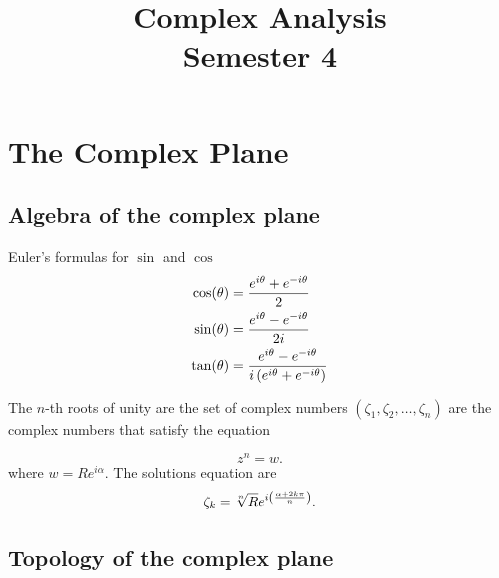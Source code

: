 \documentclass{report}
\title{\Huge{Complex Analysis}\\Semester 4}
\author{}
\date{}
\begin{document}
\maketitle
\newpage%
\tableofcontents
\pagebreak

\chapter{The Complex Plane}
\section{Algebra of the complex plane}

\begin{figure}[h]
	\centering
\end{figure}

Euler’s formulas for $\sin$ and $\cos$
\begin{align*}
	\cos(\theta) & = \frac{e^{i\theta} + e^{-i\theta}}{2}                                 \\
	\sin(\theta) & = \frac{e^{i\theta} - e^{-i\theta}}{2i}                                \\
	\tan(\theta) & = \frac{e^{i\theta} - e^{-i\theta}}{i\left(e^{i\theta}+e^{-i\theta}\right)}
\end{align*}

The $n$-th roots of unity are the set of complex numbers $(\zeta_1,\zeta_2,\dots,\zeta_n)$ are the complex numbers that satisfy the equation

\[
	z^n = w
	.\]
where $w=Re^{i\alpha}$. The solutions equation are
\[
	\zeta_k = \sqrt[n]{R} e^{i\left( \frac{\alpha + 2k\pi}{n} \right)}
	.\]

\section{Topology of the complex plane}
\end{document}
